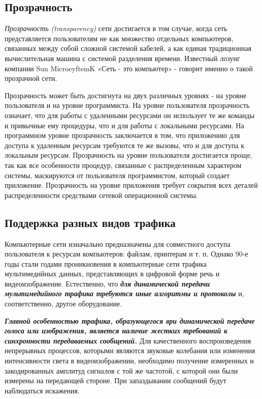 \subsection{Прозрачность}
\emph{Прозрачность (transparency)} сети достигается в том случае, когда сеть представляется пользователям не как множество отдельных компьютеров, связанных между собой сложной системой кабелей, а как единая традиционная вычислительная машина с системой разделения времени.
Известный лозунг компании Sun MicroeyftemK «Сеть - это компьютер» - говорит именно о такой прозрачной сети.

Прозрачность может быть достигнута на двух различных уровнях - на уровне пользователя и на уровне программиста.
На уровне пользователя прозрачность означает, что для работы с удаленными ресурсами он использует те же команды и привычные ему процедуры, что и для работы с локальными ресурсами.
На программном уровне прозрачность заключается в том, что приложению для доступа к удаленным ресурсам требуются те же вызовы, что и для доступа к локальным ресурсам.
Прозрачность на уровне пользователя достигается проще, так как все особенности процедур, связанные с распределенным характером системы, маскируются от пользователя программистом, который создает приложение.
Прозрачность на уровне приложения требует сокрытия всех деталей распределенности средствами сетевой операционной системы.

\subsection{Поддержка разных видов трафика}
Компьютерные сети изначально предназначены для совместного доступа пользователя к ресурсам компьютеров: файлам, принтерам и т.
п.
Однако 90-е годы стали годами проникновения в компьютерные сети трафика мультимедийных данных, представляющих в цифровой форме речь и видеоизображение.
Естественно, что \textbf{\textit{для динамической передачи мультимедийного трафика требуются иные алгоритмы и протоколы}} и, соответственно, другое оборудование.

\textbf{\textit{Главной особенностью трафика, образующегося ври динамической передаче голоса или изображения, является наличие жестких требований к синхронности передаваемых сообщений.}}
Для качественного воспроизведения непрерывных процессов, которыми являются звуковые колебания или изменения интенсивности света в видеоизображении, необходимо получение измеренных и закодированных амплитуд сигналов с той же частотой, с которой они были измерены на передающей стороне.
При запаздывании сообщений будут наблюдаться искажения.

